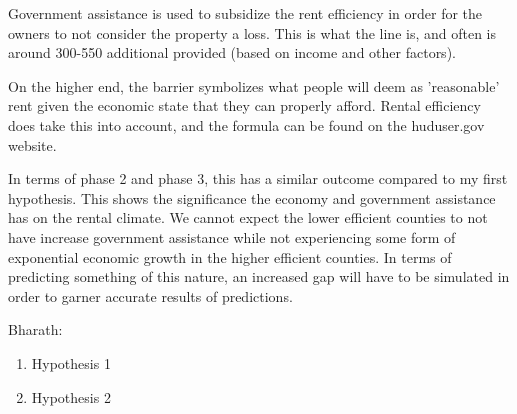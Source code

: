 \documentclass[a4paper]{article}
\begin{document}
\begin{enumerate}
\begin{enumerate}
    Government assistance is used to subsidize the rent efficiency in order for the owners to not consider the property a loss. This is what the line is, and often is around 300-550 additional provided (based on income and other factors).

    On the higher end, the barrier symbolizes what people will deem as 'reasonable' rent given the economic state that they can properly afford. Rental efficiency does take this into account, and the formula can be found on the huduser.gov website. 

    In terms of phase 2 and phase 3, this has a similar outcome compared to my first hypothesis. This shows the significance the economy and government assistance has on the rental climate. We cannot expect the lower efficient counties to not have increase government assistance while not experiencing some form of exponential economic growth in the higher efficient counties. In terms of predicting something of this nature, an increased gap will have to be simulated in order to garner accurate results of predictions. 
    
  \end{enumerate}

  Bharath:

  \begin{enumerate}
    \item Hypothesis 1
    \item Hypothesis 2
  \end{enumerate}
\end{enumerate}
\end{document}
